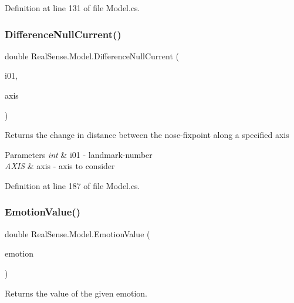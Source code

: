 Definition at line 131 of file Model.\+cs.

\mbox{\label{class_real_sense_1_1_model_a69d8b360ed9c9ddaa19a0619df408e2a}} 
\subsubsection{\texorpdfstring{Difference\+Null\+Current()}{DifferenceNullCurrent()}}
{\footnotesize\ttfamily double Real\+Sense.\+Model.\+Difference\+Null\+Current (\begin{DoxyParamCaption}\item[{int}]{i01,  }\item[{\hyperlink{class_real_sense_1_1_model_ab1d8b9992dae2162c48b52f6694f946b}{A\+X\+IS}}]{axis }\end{DoxyParamCaption})}

Returns the change in distance between the nose-\/fixpoint along a specified axis 
\begin{DoxyParams}{Parameters}
{\em int} & i01 -\/ landmark-\/number \\
\hline
{\em A\+X\+IS} & axis -\/ axis to consider \\
\hline
\end{DoxyParams}


Definition at line 187 of file Model.\+cs.

\mbox{\label{class_real_sense_1_1_model_a078b1ddb43e777aa73c1b3898722e4bb}} 
\subsubsection{\texorpdfstring{Emotion\+Value()}{EmotionValue()}}
{\footnotesize\ttfamily double Real\+Sense.\+Model.\+Emotion\+Value (\begin{DoxyParamCaption}\item[{\hyperlink{class_real_sense_1_1_model_a5bf3fde8f53519f7a740d8b4e0399208}{Emotion}}]{emotion }\end{DoxyParamCaption})}

Returns the value of the given emotion.


